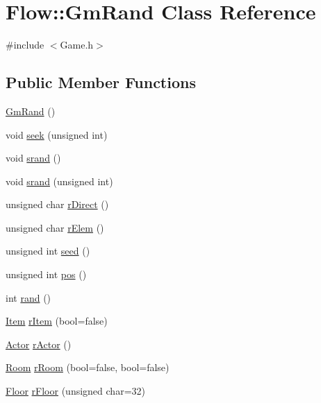\hypertarget{class_flow_1_1_gm_rand}{}\section{Flow\+:\+:Gm\+Rand Class Reference}
\label{class_flow_1_1_gm_rand}


{\ttfamily \#include $<$Game.\+h$>$}

\subsection*{Public Member Functions}
\begin{DoxyCompactItemize}
\item 
\hyperlink{class_flow_1_1_gm_rand_ad390906fe6a436491ff053e3337c70a9}{Gm\+Rand} ()
\item 
void \hyperlink{class_flow_1_1_gm_rand_a109fe067556f62419afe48f11048acf5}{seek} (unsigned int)
\item 
void \hyperlink{class_flow_1_1_gm_rand_aadd656b294e8e7330ba408486646e2f3}{srand} ()
\item 
void \hyperlink{class_flow_1_1_gm_rand_abc8aefeb9e15a414964e6e9b0665a8e7}{srand} (unsigned int)
\item 
unsigned char \hyperlink{class_flow_1_1_gm_rand_aeb38e9d08aae7a5d4788facf408b01dc}{r\+Direct} ()
\item 
unsigned char \hyperlink{class_flow_1_1_gm_rand_a7df923fe60c18e20a157de7aa599f533}{r\+Elem} ()
\item 
unsigned int \hyperlink{class_flow_1_1_gm_rand_a8a8b7dafe3991717c68beb1f13409f77}{seed} ()
\item 
unsigned int \hyperlink{class_flow_1_1_gm_rand_aef1a411df95f3d49a7180fbcd9d432c1}{pos} ()
\item 
int \hyperlink{class_flow_1_1_gm_rand_a638c37993080f31a9857d11c284c15b5}{rand} ()
\item 
\hyperlink{class_flow_1_1_item}{Item} \hyperlink{class_flow_1_1_gm_rand_afd6a5837d6c9ffa4b29e8f1fd829dfc7}{r\+Item} (bool=false)
\item 
\hyperlink{class_flow_1_1_actor}{Actor} \hyperlink{class_flow_1_1_gm_rand_a0603fa7f0b3aeb979ca2beeb628e0899}{r\+Actor} ()
\item 
\hyperlink{class_flow_1_1_room}{Room} \hyperlink{class_flow_1_1_gm_rand_a8a978d8967082e7e519996204c29eb9d}{r\+Room} (bool=false, bool=false)
\item 
\hyperlink{class_flow_1_1_floor}{Floor} \hyperlink{class_flow_1_1_gm_rand_a9ca568e62a941c10e42bedb3e334ed52}{r\+Floor} (unsigned char=32)
\end{DoxyCompactItemize}


